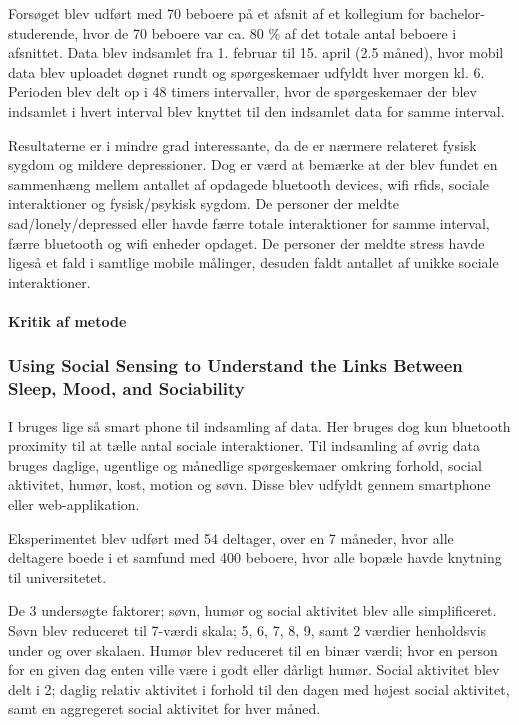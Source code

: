 Forsøget blev udført med 70 beboere på et afsnit af et kollegium for bachelor-studerende, hvor de 70 beboere var ca. 80 \% af det totale antal beboere i afsnittet.
Data blev indsamlet fra 1. februar til 15. april (2.5 måned), hvor mobil data blev uploadet døgnet rundt og spørgeskemaer udfyldt hver morgen kl. 6.
Perioden blev delt op i 48 timers intervaller, hvor de spørgeskemaer der blev indsamlet i hvert interval blev knyttet til den indsamlet data for samme interval.

Resultaterne er i mindre grad interessante, da de er nærmere relateret fysisk sygdom og mildere depressioner.
Dog er værd at bemærke at der blev fundet en sammenhæng mellem antallet af opdagede bluetooth devices, wifi rfids, sociale interaktioner og fysisk/psykisk sygdom.
De personer der meldte sad/lonely/depressed eller havde færre totale interaktioner for samme interval, færre bluetooth og wifi enheder opdaget.
De personer der meldte stress havde ligeså et fald i samtlige mobile målinger, desuden faldt antallet af unikke sociale interaktioner.

\paragraph{Kritik af metode}


\subsubsection{Using Social Sensing to Understand the Links Between Sleep, Mood, and Sociability}
I \citet{social_sensing_2} bruges lige så smart phone til indsamling af data.
Her bruges dog kun bluetooth proximity til at tælle antal sociale interaktioner.
Til indsamling af øvrig data bruges daglige, ugentlige og månedlige spørgeskemaer omkring forhold, social aktivitet, humør, kost, motion og søvn.
Disse blev udfyldt gennem smartphone eller web-applikation.

Eksperimentet blev udført med 54 deltager, over en 7 måneder, hvor alle deltagere boede i et samfund med 400 beboere, hvor alle bopæle havde knytning til universitetet.

De 3 undersøgte faktorer; søvn, humør og social aktivitet blev alle simplificeret.
Søvn blev reduceret til 7-værdi skala; 5, 6, 7, 8, 9, samt 2 værdier henholdsvis under og over skalaen.
Humør blev reduceret til en binær værdi; hvor en person for en given dag enten ville være i godt eller dårligt humør.
Social aktivitet blev delt i 2; daglig relativ aktivitet i forhold til den dagen med højest social aktivitet, samt en aggregeret social aktivitet for hver måned.

